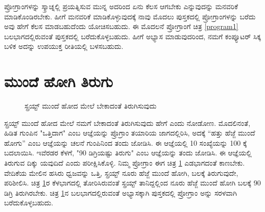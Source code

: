 ಪ್ರೋಗ್ರಾಂಗಳನ್ನು ಸ್ಕ್ರಾಚ್ನಲ್ಲಿ ಪ್ರಯತ್ನಿಸುವ ಮುನ್ನ ಅದರಿಂದ ಏನು ಕೆಲಸ ಆಗಬೇಕು ಎನ್ನುವುದನ್ನು ಮನವರಿಕೆ ಮಾಡಿಕೊಂಡಿರಬೇಕು. ಹೀಗೆ ಮನವರಿಕೆ ಮಾಡಿಕೊಳ್ಳುವುದಕ್ಕೆ ನಾವು ಮೊದಲು ಪುಸ್ತಕದಲ್ಲಿ ಪ್ರೋಗ್ರಾಂಗಳನ್ನು ಬರೆದು ಅವು ಹೇಗೆ ಕೆಲಸ ಮಾಡಬಹುದೆಂದು ಯೋಚಿಸಬಹುದು.  ಈ ಮೊದಲನೆ ಪ್ರೋಗ್ರಾಂಗೆ ಚಿತ್ರ \ref{program1} ಬಲಭಾಗದಲ್ಲಿರುವಂತೆ ಪುಸ್ತಕದಲ್ಲಿ  ಬರೆದುಕೊಳ್ಳಬಹುದು.  ಹೀಗೆ ಅಭ್ಯಾಸ ಮಾಡುವುದರಿಂದ, ನಮಗೆ ಕಂಪ್ಯೂಟರ್ ಸಿಕ್ಕ ಬಳಿಕ ಅದನ್ನು ಉಪಯುಕ್ತ ರೀತಿಯಲ್ಲಿ ಬಳಸಬಹುದು. 

\section{ಮುಂದೆ ಹೋಗಿ ತಿರುಗು}

\begin{figure}[h]
\begin{center}
\begin{multicols}{2}
\begin{Scratch}[1]
\beginbox{}
\end{Scratch}


\end{multicols}

\end{center}
\caption{ಸ್ಪ್ರಯ್ಟ್ ಮುಂದೆ ಹೋದ ಮೇಲೆ ಬೇಕಾದಂತೆ ತಿರುಗಿಸುವುದು}
\label{program2}
\end{figure}

ಸ್ಪ್ರಯ್ಟ್ ಮುಂದೆ ಹೋದ ಮೇಲೆ ನಮಗೆ ಬೇಕಾದಂತೆ ತಿರುಗಿಸುವುದು ಹೇಗೆ ಎಂದು ನೋಡೋಣ. ಮೊದಲಿನಂತೆ, ಹಿಡಿತ ಗುಂಪಿನ "ಒತ್ತಿದಾಗ" ಎಂಬ ಆಜ್ಞೆಯನ್ನು ಪ್ರೊಗ್ರಾಂ ತಯಾರಿಯ ಜಾಗದಲ್ಲಿರಿಸಿ, ಅದಕ್ಕೆ “ಹತ್ತು ಹೆಜ್ಜೆ ಮುಂದೆ ಹೋಗು” ಎಂಬ ಆಜ್ಞೆಯನ್ನು ಚಲನೆ ಗುಂಪಿನಿಂದ ತಂದು ಜೋಡಿಸಿ.  ಈ ಆಜ್ಞೆಯಲ್ಲಿ 10 ಸಂಖ್ಯೆಯನ್ನು 100 ಕ್ಕೆ ಬದಲಾಯಿಸಿ.  ಇವೆರಡರ ಕೆಳಗೆ,  "90 ಡಿಗ್ರಿಯಷ್ಟು ತಿರುಗು" ಎಂಬ ಆಜ್ಞೆಯನ್ನು ತಂದು ಜೋಡಿಸಿ.  ಈ ಆಜ್ಞೆಯಲ್ಲಿ ತಿರುಗುವ ದಿಕ್ಕು ಯವುದಿದೆ ಎಂದು ಪರೀಕ್ಷಿಸಿಕೊಳ್ಳಿ. ನಿಮ್ಮ ಪ್ರೋಗ್ರಾಂ ಈಗ ಚಿತ್ರ \ref{program2}  ಎಡಭಾಗದಂತೆ ಕಾಣಬೇಕು.    ವೇದಿಕೆಯ ಮೇಲಿನ ಹಸಿರು ಧ್ವಜವನ್ನು ಒತ್ತಿ,  ಸ್ಪ್ರಯ್ಟ್ ನೂರು ಹೆಜ್ಜೆ ಮುಂದೆ ಹೋಗಿ, ಬಲಕ್ಕೆ ತಿರುಗುವುದೇ, ಪರಿಶೀಲಿಸಿ.  ಚಿತ್ರ \ref{program2}ರ ಕೆಳಭಾಗದಲ್ಲಿ ತೋರಿಸಿರುವಂತೆ ಸ್ಪ್ರಯ್ಟ್ ತಾನಿದ್ದಲ್ಲಿಂದ ನೂರು ಹೆಜ್ಜೆ ಮುಂದೆ ಹೋಗಿ ಬಲಕ್ಕೆ 90 ಡಿಗ್ರಿ ತಿರುಗಿರಬೇಕು.  ಚಿತ್ರ \ref{program2}ನ ಬಲಭಾಗದಲ್ಲಿರುವಂತೆ  ಅಭ್ಯಾಸಕ್ಕಾಗಿ ಪುಸ್ತಕದಲ್ಲಿ  ಪ್ರೋಗ್ರಾಂ ಅನ್ನು ಸರಳವಾಗಿ ಬರೆದುಕೊಳ್ಳಬಹುದು. 

